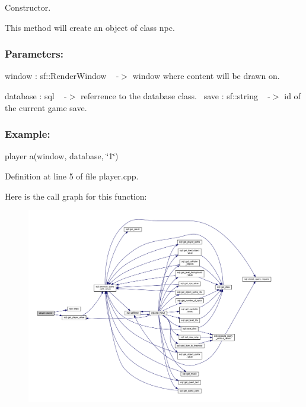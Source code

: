 Constructor. 

This method will create an object of class npc.~\newline


\subsubsection*{Parameters\+: }

window \+: sf\+::\+Render\+Window ~\newline
-\/$>$ window where content will be drawn on.

database \+: sql ~\newline
-\/$>$ referrence to the database class.~\newline
 save \+: sf\+::string ~\newline
-\/$>$ id of the current game save.

\subsubsection*{Example\+: }

player a(window, database, \char`\"{}1\char`\"{})~\newline


Definition at line 5 of file player.\+cpp.

Here is the call graph for this function\+:
\nopagebreak
\begin{figure}[H]
\begin{center}
\leavevmode
\includegraphics[width=350pt]{classplayer_a1a369fcd087aa48f9241fb20c8df52f3_cgraph}
\end{center}
\end{figure}
\mbox{\label{classplayer_aab5d2e47b80e0481f09ca0df8b823057}} 
